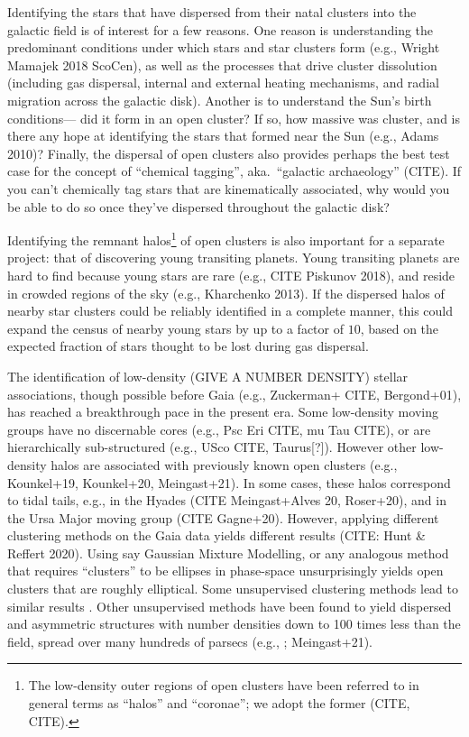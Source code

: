 \documentclass[12pt,twocolumn,tighten]{aastex63}
\begin{document}
Identifying the stars that have dispersed from their natal clusters
into the galactic field is of interest for a few reasons.  One 
reason is understanding the predominant conditions under which stars and star
clusters form (e.g., Wright Mamajek 2018 ScoCen), as well as
the processes that drive cluster dissolution (including gas dispersal,
internal and external heating mechanisms, and radial migration across
the galactic disk).
Another is to understand the Sun's birth conditions---
did it form in an open
cluster? If so, how massive was cluster, and is there any hope at
identifying the stars that formed near the Sun (e.g., Adams 2010)?
Finally, the dispersal of open clusters also provides perhaps
the best test case for the concept of ``chemical tagging'', aka.\
``galactic archaeology'' (CITE).  If you can't chemically tag stars
that are kinematically associated, why would you be able to do so once
they've dispersed throughout the galactic disk?

Identifying the remnant
halos\footnote{ The low-density outer regions of open clusters have
been referred to in general terms as ``halos'' and ``coronae''; we
adopt the former (CITE, CITE). } of open clusters is also important for a
separate project: that of discovering young transiting planets.  Young
transiting planets are hard to find because young stars are rare
(e.g., CITE Piskunov 2018), and reside in crowded regions of the
sky (e.g., Kharchenko 2013).  If the dispersed halos of
nearby star clusters could be reliably identified in a complete
manner, this could expand the census of nearby young stars by up to
a factor of $10$, based on the expected fraction of stars thought to
be lost during gas dispersal.

The identification of low-density (GIVE A NUMBER DENSITY) stellar
associations, though possible before Gaia (e.g.,
Zuckerman+ CITE, Bergond+01), has reached a breakthrough pace in the present era.
Some low-density moving groups have no discernable
cores (e.g., Psc Eri CITE, mu Tau CITE), or are hierarchically
sub-structured (e.g., USco CITE, Taurus[?]).
However other
low-density
halos are associated with previously known open clusters (e.g.,
Kounkel+19, Kounkel+20, Meingast+21).  In some
cases, these halos correspond to tidal tails, e.g., in the Hyades
(CITE Meingast+Alves 20, Roser+20), and in the Ursa Major moving
group (CITE Gagne+20). 
However, applying different clustering methods on the
Gaia data yields different results (CITE: Hunt \& Reffert 2020).
Using say Gaussian Mixture Modelling, or any analogous method that
requires ``clusters'' to be ellipses in phase-space unsurprisingly
yields open clusters that are roughly elliptical.  Some unsupervised
clustering methods lead to similar results \citep[][hereafter
]{cantatgaudin_gaia_2018}.  Other
unsupervised methods
have been found to yield dispersed and asymmetric structures
with number densities down to 100 times less than the field, spread
over many hundreds of parsecs
(e.g., \citep[][hereafter
]{kounkel_untangling_2019}; Meingast+21).
\end{document}
